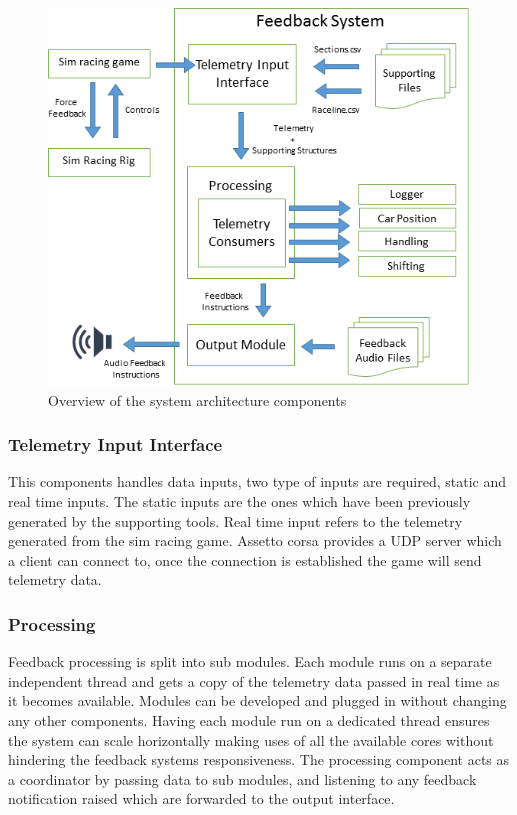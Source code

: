 \begin{figure}[!htb]
	\centering
	\includegraphics[height=10cm]{images/SystemArch}
	\caption{Overview of the system architecture components}
	\label{fig:SystemArch}
\end{figure}

\subsubsection{Telemetry Input Interface}
This components handles data inputs, two type of inputs are required, static and real time inputs. The static inputs are the ones which have been previously generated by the supporting tools. Real time input refers to the telemetry generated from the sim racing game. Assetto corsa provides a UDP server which a client can connect to, once the connection is established the game will send telemetry data.

\subsubsection{Processing}
Feedback processing is split into sub modules. Each module runs on a separate independent thread and gets a copy of the telemetry data passed in real time as it becomes available. Modules can be developed and plugged in without changing any other components. Having each module run on a dedicated thread ensures the system can scale horizontally making uses of all the available cores without hindering the feedback systems responsiveness. The processing component acts as a coordinator by passing data to sub modules, and listening to any feedback notification raised which are forwarded to the output interface.

